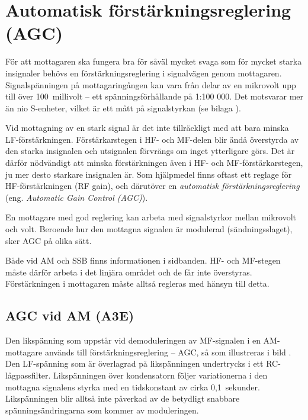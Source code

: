 \section[AGC]{Automatisk förstärknings\-reglering (AGC)}
\label{AGC}

För att mottagaren ska fungera bra för såväl mycket svaga som för mycket starka
insignaler behövs en förstärkningsreglering i signalvägen genom mottagaren.
Signalspänningen på mottagaringången kan vara från delar av en mikrovolt upp
till över 100~millivolt -- ett spänningsförhållande på 1:100 000.
Det motsvarar mer än nio S-enheter, vilket är ett mått på signalstyrkan
(se bilaga ).

Vid mottagning av en stark signal är det inte tillräckligt med att
bara minska LF-förstärkningen.
Förstärkarstegen i HF- och MF-delen blir ändå överstyrda av den starka
insignalen och utsignalen förvrängs om inget ytterligare görs.
Det är därför nödvändigt att minska förstärkningen även i HF- och
MF-förstärkarstegen, ju mer desto starkare insignalen är.
Som hjälpmedel finns oftast ett reglage för HF-förstärkningen (RF gain), och
därutöver en \emph{automatisk förstärkningsreglering} (eng. \emph{Automatic
Gain Control (AGC)}).

En mottagare med god reglering kan arbeta med signalstyrkor mellan mikrovolt
och volt.
Beroende hur den mottagna signalen är modulerad (sändningsslaget), sker AGC
på olika sätt.

Både vid AM och SSB finns informationen i sidbanden.
HF- och MF-stegen måste därför arbeta i det linjära området och de får inte
överstyras.
Förstärkningen i mottagaren måste alltså regleras med hänsyn till detta.

\subsection{AGC vid AM (A3E)}


Den likspänning som uppstår vid demoduleringen av MF-signalen i en
AM-mottagare används till förstärkningsreglering -- AGC, så som illustreras
i bild .
Den LF-spänning som är överlagrad på likspänningen undertrycks i ett
RC-lågpassfilter.
Likspänningen över kondensatorn följer variationerna i den mottagna signalens
styrka med en tidskonstant av cirka 0,1~sekunder.
Likspänningen blir alltså inte påverkad av de betydligt snabbare
spänningsändringarna som kommer av moduleringen.

